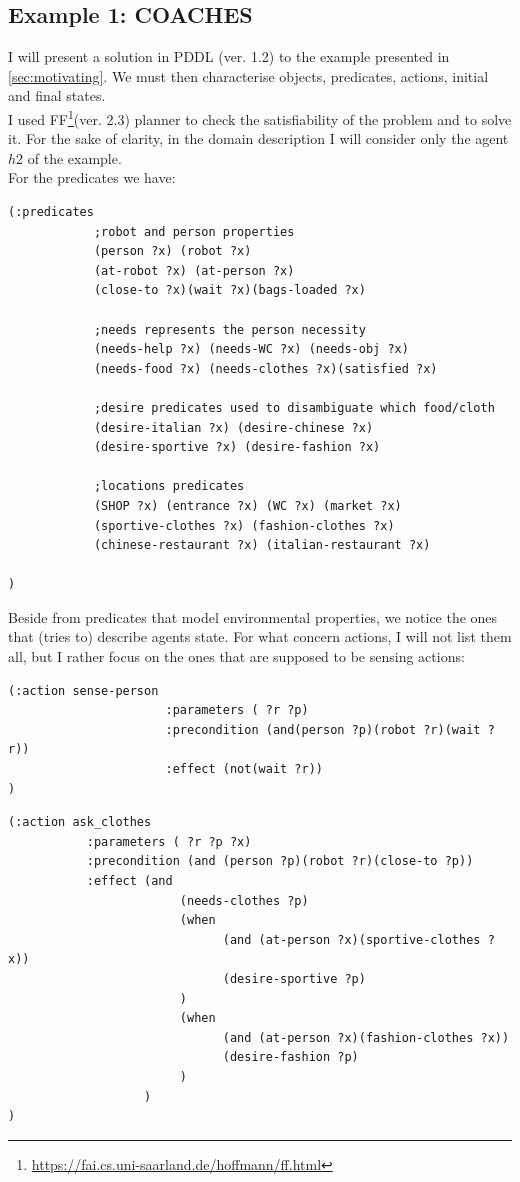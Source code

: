 \documentclass[pdftex,12pt,a4paper]{report}
\begin{document}
\newpage
\subsection{Example 1: COACHES}
I will present a solution in PDDL (ver. 1.2) to the example presented in \ref{sec:motivating}.
We must then characterise objects, predicates, actions, initial and final states.\\
I used FF\cite{hoffmann:nebel:jair-01}\footnote{\url{https://fai.cs.uni-saarland.de/hoffmann/ff.html}}(ver. 2.3)  planner to check the satisfiability of the problem and to solve it.
For the sake of clarity, in the domain description I will consider only the agent $h2$ of the example. \\

\noindent For the predicates we have:
\begin{verbatim}
(:predicates
            ;robot and person properties
            (person ?x) (robot ?x)
            (at-robot ?x) (at-person ?x)
            (close-to ?x)(wait ?x)(bags-loaded ?x)

            ;needs represents the person necessity
            (needs-help ?x) (needs-WC ?x) (needs-obj ?x)
            (needs-food ?x) (needs-clothes ?x)(satisfied ?x)

            ;desire predicates used to disambiguate which food/cloth
            (desire-italian ?x) (desire-chinese ?x)
            (desire-sportive ?x) (desire-fashion ?x)

            ;locations predicates
            (SHOP ?x) (entrance ?x) (WC ?x) (market ?x)
            (sportive-clothes ?x) (fashion-clothes ?x)
            (chinese-restaurant ?x) (italian-restaurant ?x)

)
\end{verbatim}
Beside from predicates that model environmental properties, we notice the ones that (tries to) describe agents state. 
\noindent For what concern actions, I will not list them all, but I rather focus on the ones that are supposed to be sensing actions:
\begin{verbatim}
(:action sense-person
                      :parameters ( ?r ?p)
                      :precondition (and(person ?p)(robot ?r)(wait ?r))
                      :effect (not(wait ?r))
)
\end{verbatim}

\begin{verbatim}
(:action ask_clothes
           :parameters ( ?r ?p ?x)
           :precondition (and (person ?p)(robot ?r)(close-to ?p))
           :effect (and
                        (needs-clothes ?p)
                        (when
                              (and (at-person ?x)(sportive-clothes ?x))
                              (desire-sportive ?p)
                        )
                        (when
                              (and (at-person ?x)(fashion-clothes ?x))
                              (desire-fashion ?p)
                        )
                   )
)
\end{verbatim}
\end{document}
